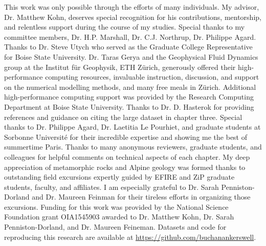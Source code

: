 This work was only possible through the efforts of many individuals. My advisor, Dr. Matthew Kohn, deserves special recognition for his contributions, mentorship, and relentless support during the course of my studies. Special thanks to my committee members, Dr. H.P. Marshall, Dr. C.J. Northrup, Dr. Philippe Agard. Thanks to Dr. Steve Utych who served as the Graduate College Representative for Boise State University. Dr. Taras Gerya and the Geophysical Fluid Dynamics group at the Institut für Geophysik, ETH Zürich, generously offered their high-performance computing resources, invaluable instruction, discussion, and support on the numerical modelling methods, and many free meals in Zürich. Additional high-performance computing support was provided by the Research Computing Department at Boise State University. Thanks to Dr. D. Hasterok for providing references and guidance on citing the large dataset in chapter three. Special thanks to Dr. Philippe Agard, Dr. Laetitia Le Pourhiet, and graduate students at Sorbonne Université for their incredible expertise and showing me the best of summertime Paris. Thanks to many anonymous reviewers, graduate students, and colleagues for helpful comments on technical aspects of each chapter. My deep appreciation of metamorphic rocks and Alpine geology was formed thanks to outstanding field excursions expertly guided by EFIRE and ZiP graduate students, faculty, and affiliates. I am especially grateful to Dr. Sarah Penniston-Dorland and Dr. Maureen Feinman for their tireless efforts in organizing those excursions. Funding for this work was provided by the National Science Foundation grant OIA1545903 awarded to Dr. Matthew Kohn, Dr. Sarah Penniston-Dorland, and Dr. Maureen Feineman. Datasets and code for reproducing this research are available at \url{https://github.com/buchanankerswell}.